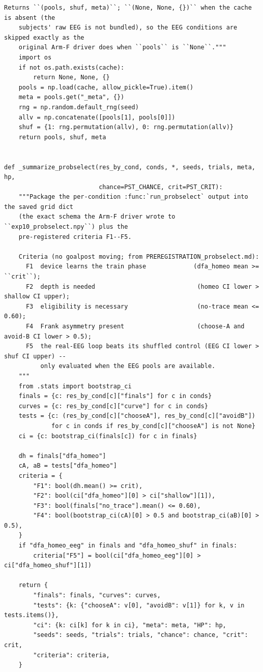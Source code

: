 \begin{lstlisting}[caption={mrl\_trace/probselect.py},label={lst:siox-src-probselect}]
    Returns ``(pools, shuf, meta)``; ``(None, None, {})`` when the cache is absent (the
    subjects' raw EEG is not bundled), so the EEG conditions are skipped exactly as the
    original Arm-F driver does when ``pools`` is ``None``."""
    import os
    if not os.path.exists(cache):
        return None, None, {}
    pools = np.load(cache, allow_pickle=True).item()
    meta = pools.get("_meta", {})
    rng = np.random.default_rng(seed)
    allv = np.concatenate([pools[1], pools[0]])
    shuf = {1: rng.permutation(allv), 0: rng.permutation(allv)}
    return pools, shuf, meta


def _summarize_probselect(res_by_cond, conds, *, seeds, trials, meta, hp,
                          chance=PST_CHANCE, crit=PST_CRIT):
    """Package the per-condition :func:`run_probselect` output into the saved grid dict
    (the exact schema the Arm-F driver wrote to ``exp10_probselect.npy``) plus the
    pre-registered criteria F1--F5.

    Criteria (no goalpost moving; from PREREGISTRATION_probselect.md):
      F1  device learns the train phase             (dfa_homeo mean >= ``crit``);
      F2  depth is needed                            (homeo CI lower > shallow CI upper);
      F3  eligibility is necessary                   (no-trace mean <= 0.60);
      F4  Frank asymmetry present                    (choose-A and avoid-B CI lower > 0.5);
      F5  the real-EEG loop beats its shuffled control (EEG CI lower > shuf CI upper) --
          only evaluated when the EEG pools are available.
    """
    from .stats import bootstrap_ci
    finals = {c: res_by_cond[c]["finals"] for c in conds}
    curves = {c: res_by_cond[c]["curve"] for c in conds}
    tests = {c: (res_by_cond[c]["chooseA"], res_by_cond[c]["avoidB"])
             for c in conds if res_by_cond[c]["chooseA"] is not None}
    ci = {c: bootstrap_ci(finals[c]) for c in finals}

    dh = finals["dfa_homeo"]
    cA, aB = tests["dfa_homeo"]
    criteria = {
        "F1": bool(dh.mean() >= crit),
        "F2": bool(ci["dfa_homeo"][0] > ci["shallow"][1]),
        "F3": bool(finals["no_trace"].mean() <= 0.60),
        "F4": bool(bootstrap_ci(cA)[0] > 0.5 and bootstrap_ci(aB)[0] > 0.5),
    }
    if "dfa_homeo_eeg" in finals and "dfa_homeo_shuf" in finals:
        criteria["F5"] = bool(ci["dfa_homeo_eeg"][0] > ci["dfa_homeo_shuf"][1])

    return {
        "finals": finals, "curves": curves,
        "tests": {k: {"chooseA": v[0], "avoidB": v[1]} for k, v in tests.items()},
        "ci": {k: ci[k] for k in ci}, "meta": meta, "HP": hp,
        "seeds": seeds, "trials": trials, "chance": chance, "crit": crit,
        "criteria": criteria,
    }



\end{lstlisting}
